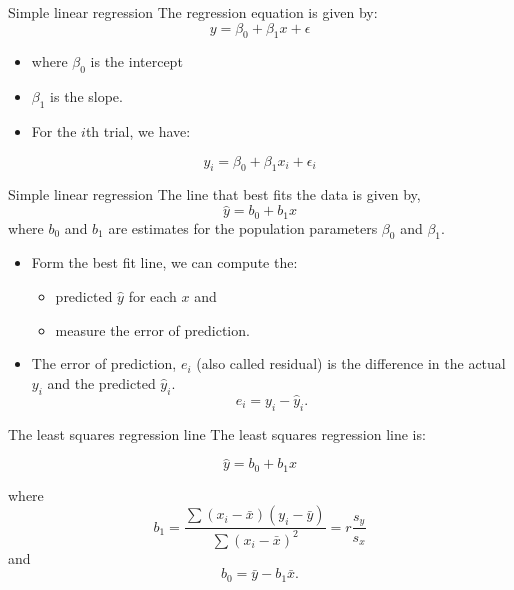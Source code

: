 \documentclass[
  ignorenonframetext,
]{beamer}
\providecommand{\tightlist}{%
  \setlength{\itemsep}{0pt}\setlength{\parskip}{0pt}}
\begin{document}
\begin{frame}{Simple linear regression}
\protect\hypertarget{simple-linear-regression-2}{}
The regression equation is given by: \[y=\beta_0+\beta_1x+\epsilon\]

\begin{itemize}
\item
  where \(\beta_0\) is the intercept
\item
  \(\beta_1\) is the slope.
\item
  For the \(i\)th trial, we have:
\end{itemize}

\[y_i=\beta_0+\beta_1x_i+\epsilon_i\]
\end{frame}

\begin{frame}{Simple linear regression}
\protect\hypertarget{simple-linear-regression-3}{}
The line that best fits the data is given by, \[\hat{y}=b_0+b_1x\] where
\(b_0\) and \(b_1\) are estimates for the population parameters
\(\beta_0\) and \(\beta_1\).

\begin{itemize}
\item
  Form the best fit line, we can compute the:

  \begin{itemize}
  \tightlist
  \item
    predicted \(\hat{y}\) for each \(x\) and
  \item
    measure the error of prediction.
  \end{itemize}
\item
  The error of prediction, \(e_i\) (also called residual) is the
  difference in the actual \(y_i\) and the predicted \(\hat{y}_i\).
  \[e_i=y_i-\hat{y}_i.\]
\end{itemize}
\end{frame}

\begin{frame}{The least squares regression line}
\protect\hypertarget{the-least-squares-regression-line}{}
The least squares regression line is:

\[\hat{y}=b_0+b_1x\]

where
\[b_1=\frac{\sum(x_i-\bar{x})(y_i-\bar{y})}{\sum(x_i-\bar{x})^2}=r \frac{s_y}{s_x}\]
and \[b_0=\bar{y}-b_1\bar{x}.\]
\end{frame}
\end{document}
